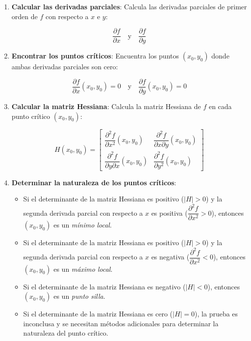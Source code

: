 \begin{enumerate}
	\item \textbf{Calcular las derivadas parciales}:  Calcula las derivadas parciales de primer orden de $f$ con respecto a $x$ e $y$:
	
	$$\frac{\partial f}{\partial x} \quad \text{y} \quad \frac{\partial f}{\partial y}$$
	
	\item \textbf{Encontrar los puntos críticos}:  Encuentra los puntos $(x_0, y_0)$ donde ambas derivadas parciales son cero:
	
	$$\frac{\partial f}{\partial x}(x_0, y_0) = 0 \quad \text{y} \quad \frac{\partial f}{\partial y}(x_0, y_0) = 0$$
	
	\item \textbf{Calcular la matriz Hessiana}: Calcula la matriz Hessiana de $f$ en cada punto crítico $(x_0, y_0)$:
	
	$$H(x_0, y_0) = \begin{bmatrix} 
		\dfrac{\partial^2 f}{\partial x^2}(x_0, y_0) & \dfrac{\partial^2 f}{\partial x \partial y}(x_0, y_0) \\[3mm]
		\dfrac{\partial^2 f}{\partial y \partial x}(x_0, y_0) & \dfrac{\partial^2 f}{\partial y^2}(x_0, y_0) 
	\end{bmatrix}$$
	
	\item \textbf{Determinar la naturaleza de los puntos críticos}:
	\begin{itemize}
		\item Si el determinante de la matriz Hessiana es positivo ($|H| > 0$) y la segunda derivada parcial con respecto a $x$ es positiva ($\dfrac{\partial^2 f}{\partial x^2} > 0$), entonces $(x_0, y_0)$ es un \textit{mínimo local}.
		
		\item Si el determinante de la matriz Hessiana es positivo ($|H| > 0$) y la segunda derivada parcial con respecto a $x$ es negativa ($\dfrac{\partial^2 f}{\partial x^2} < 0$), entonces $(x_0, y_0)$ es un \textit{máximo local}.
		
		\item Si el determinante de la matriz Hessiana es negativo ($|H| < 0$), entonces $(x_0, y_0)$ es un \textit{punto silla}.
		
		\item Si el determinante de la matriz Hessiana es cero ($|H| = 0$), la prueba es inconclusa y se necesitan métodos adicionales para determinar la naturaleza del punto crítico.
	\end{itemize}
\end{enumerate}

